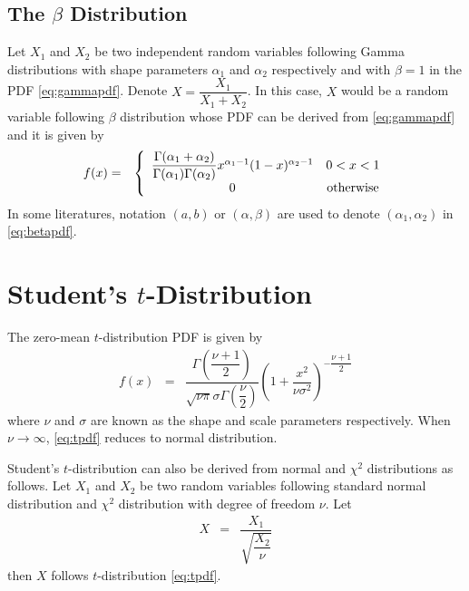 \subsection{The $\beta$ Distribution}

Let $X_1$ and $X_2$ be two independent random variables following Gamma distributions with shape parameters $\alpha_1$ and $\alpha_2$ respectively and with $\beta = 1$ in the PDF \eqref{eq:gammapdf}. Denote $X=\dfrac{X_1}{X_1+X_2}$. In this case, $X$ would be a random variable following $\beta$ distribution whose PDF can be derived from \eqref{eq:gammapdf} and it is given by
\begin{eqnarray}
  f(x) &=& \left\{\begin{array}{cc}
                    \dfrac{\Gamma(\alpha_1 + \alpha_2)}{\Gamma(\alpha_1)\Gamma(\alpha_2)}x^{\alpha_1-1}(1-x)^{\alpha_2-1} & 0 < x < 1 \\
                    0 & \textup{otherwise}
                  \end{array}\right. \label{eq:betapdf}
\end{eqnarray}
In some literatures, notation $(a, b)$ or $(\alpha, \beta)$ are used to denote $(\alpha_1, \alpha_2)$ in \eqref{eq:betapdf}.

\section{Student's $t$-Distribution}



The zero-mean $t$-distribution PDF is given by
\begin{eqnarray}
	f(x) &=& \dfrac{\Gamma\left(\dfrac{\nu+1}{2}\right)}{\sqrt{\nu\pi}\sigma\Gamma\left(\dfrac{\nu}{2}\right)}\left(1+\dfrac{x^2}{\nu\sigma^2}\right)^{-\dfrac{\nu+1}{2}} \label{eq:tpdf}
\end{eqnarray}
where $\nu$ and $\sigma$ are known as the shape and scale parameters respectively. When $\nu\rightarrow\infty$, \eqref{eq:tpdf} reduces to normal distribution. 

Student's $t$-distribution can also be derived from normal and $\chi^2$ distributions as follows. Let $X_1$ and $X_2$ be two random variables following standard normal distribution and $\chi^2$ distribution with degree of freedom $\nu$. Let
\begin{eqnarray}
	X &=& \dfrac{X_1}{\sqrt{\dfrac{X_2}{\nu}}} \nonumber
\end{eqnarray}
then $X$ follows $t$-distribution \eqref{eq:tpdf}.


